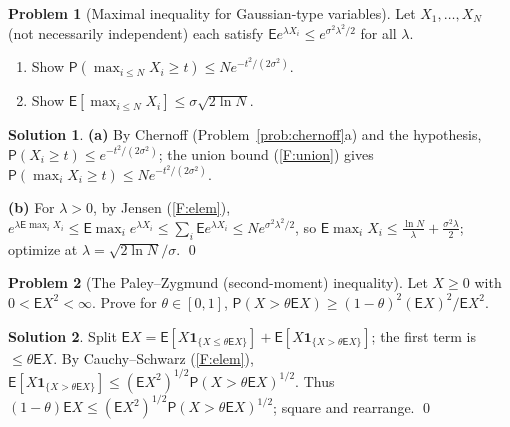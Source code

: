 \documentclass[12pt,a4paper]{article}
\theoremstyle{definition}
\newtheorem{exercise}{Problem}
\newtheorem*{solution*}{Solution}
\newcommand\expc{\mathsf{E}}
\newcommand\prb{\mathsf{P}}
\begin{document}
\begin{exercise}[Maximal inequality for Gaussian-type variables]\label{prob:maximal}
Let $X_1,\ldots,X_N$ (not necessarily independent) each satisfy $\expc e^{\lambda X_i}\le e^{\sigma^2\lambda^2/2}$ for all $\lambda$.
\begin{enumerate}[label=(\alph*)]
\item Show $\prb(\max_{i\le N}X_i\ge t)\le N e^{-t^2/(2\sigma^2)}$.
\item Show $\expc[\max_{i\le N}X_i]\le\sigma\sqrt{2\ln N}$.
\end{enumerate}
\end{exercise}
\begin{solution*}
\textbf{(a)} By Chernoff (Problem~\ref{prob:chernoff}a) and the hypothesis, $\prb(X_i\ge t)\le e^{-t^2/(2\sigma^2)}$; the union bound (\ref{F:union}) gives $\prb(\max_iX_i\ge t)\le N e^{-t^2/(2\sigma^2)}$.

\textbf{(b)} For $\lambda>0$, by Jensen (\ref{F:elem}), $e^{\lambda\expc\max_iX_i}\le\expc\max_ie^{\lambda X_i}\le\sum_i\expc e^{\lambda X_i}\le N e^{\sigma^2\lambda^2/2}$, so $\expc\max_iX_i\le\tfrac{\ln N}\lambda+\tfrac{\sigma^2\lambda}2$; optimize at $\lambda=\sqrt{2\ln N}/\sigma$. \qed
\end{solution*}

\begin{exercise}[The Paley--Zygmund (second-moment) inequality]\label{prob:pz}
Let $X\ge0$ with $0<\expc X^2<\infty$. Prove for $\theta\in[0,1]$, $\prb(X>\theta\expc X)\ge(1-\theta)^2(\expc X)^2/\expc X^2$.
\end{exercise}
\begin{solution*}
Split $\expc X=\expc[X\mathbf 1_{\{X\le\theta\expc X\}}]+\expc[X\mathbf 1_{\{X>\theta\expc X\}}]$; the first term is $\le\theta\expc X$. By Cauchy--Schwarz (\ref{F:elem}), $\expc[X\mathbf 1_{\{X>\theta\expc X\}}]\le(\expc X^2)^{1/2}\prb(X>\theta\expc X)^{1/2}$. Thus $(1-\theta)\expc X\le(\expc X^2)^{1/2}\prb(X>\theta\expc X)^{1/2}$; square and rearrange. \qed
\end{solution*}
\end{document}
